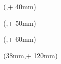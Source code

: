 \titlehead{\hsmatyp\ in\  \hsmastudienganglang}
\subject{}
\title{\hsmatitel}
\author{\hsmaauthor}
\date{\small{\hsmadatum}}


\newlength{\bindekorrektur}
\newlength{\seitenanfang}
\newlength{\seitenbreite}
  
\setlength{\bindekorrektur}{-46mm}   %
\setlength{\seitenanfang}{0mm}       %
\setlength{\seitenbreite}{297mm}


\begin{textblock*}{\seitenbreite}(\bindekorrektur,\seitenanfang + 40mm)
  \centering\large \sffamily
  \textbf{\hsmafirma}
\end{textblock*}

\begin{textblock*}{\seitenbreite}(\bindekorrektur,\seitenanfang + 50mm)
  \centering\large\sffamily
  \textbf{\hsmafakultaetlang} %
\end{textblock*}

\begin{textblock*}{\seitenbreite}(\bindekorrektur,\seitenanfang + 60mm)
  \centering\large\sffamily
  \textbf{\hsmaInstitut} \\
  \vspace{25mm}
  \textbf{\hsmatyp}
\end{textblock*}

\begin{textblock*}{128mm}(38mm,\seitenanfang + 120mm) %
  \centering\Large\sffamily
  \hsmatitel \\
  \vspace{4mm}
  \hsmatitelen
\end{textblock*}%

